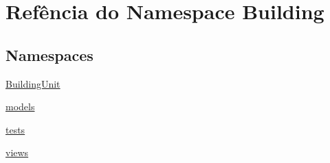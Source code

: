 \hypertarget{namespaceBuilding}{\section{Refência do Namespace Building}
\label{namespaceBuilding}
}
\subsection*{Namespaces}
\begin{DoxyCompactItemize}
\item 
\hyperlink{namespaceBuilding_1_1BuildingUnit}{Building\-Unit}
\item 
\hyperlink{namespaceBuilding_1_1models}{models}
\item 
\hyperlink{namespaceBuilding_1_1tests}{tests}
\item 
\hyperlink{namespaceBuilding_1_1views}{views}
\end{DoxyCompactItemize}
